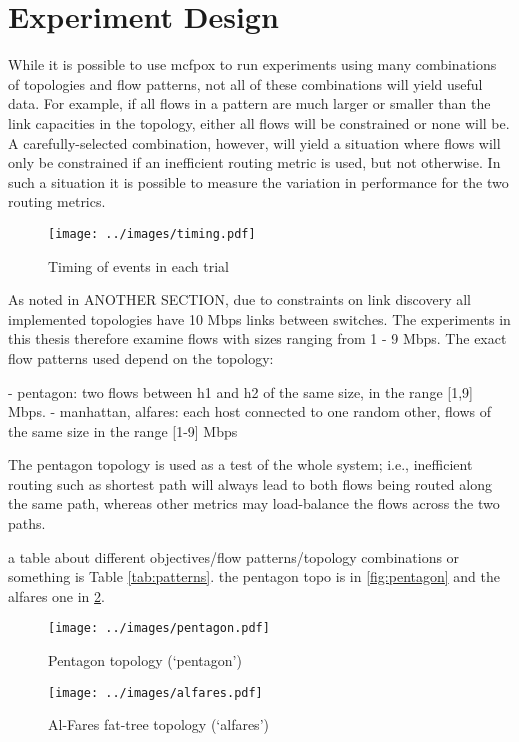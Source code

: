 \section{Experiment Design}
While it is possible to use mcfpox to run experiments using many combinations of topologies and flow patterns, not all of these combinations will yield useful data. For example, if all flows in a pattern are much larger or smaller than the link capacities in the topology, either all flows will be constrained or none will be. A carefully-selected combination, however, will yield a situation where flows will only be constrained if an inefficient routing metric is used, but not otherwise. In such a situation it is possible to measure the variation in performance for the two routing metrics.

\begin{figure}
  \centering
  \texttt{[image: ../images/timing.pdf]}
  \caption{Timing of events in each trial}
  \label{fig:timing}
\end{figure}

As noted in ANOTHER SECTION, due to constraints on link discovery all implemented topologies have 10 Mbps links between switches. The experiments in this thesis therefore examine flows with sizes ranging from 1 - 9 Mbps. The exact flow patterns used depend on the topology:

- pentagon: two flows between h1 and h2 of the same size, in the range [1,9] Mbps.
- manhattan, alfares: each host connected to one random other, flows of the same size in the range [1-9] Mbps

The pentagon topology is used as a test of the whole system; i.e., inefficient routing such as shortest path will always lead to both flows being routed along the same path, whereas other metrics may load-balance the flows across the two paths.

a table about different objectives/flow patterns/topology combinations or something is Table \ref{tab:patterns}. the pentagon topo is in \ref{fig:pentagon} and the alfares one in \ref{fig:alfares}.

\begin{figure}
  \centering
  \texttt{[image: ../images/pentagon.pdf]}
  \caption{Pentagon topology (`pentagon')}
  \label{fig:pentagon}

  \vspace{2cm}


  \texttt{[image: ../images/alfares.pdf]}
  \caption{Al-Fares fat-tree topology (`alfares')}
  \label{fig:alfares}
\end{figure}

